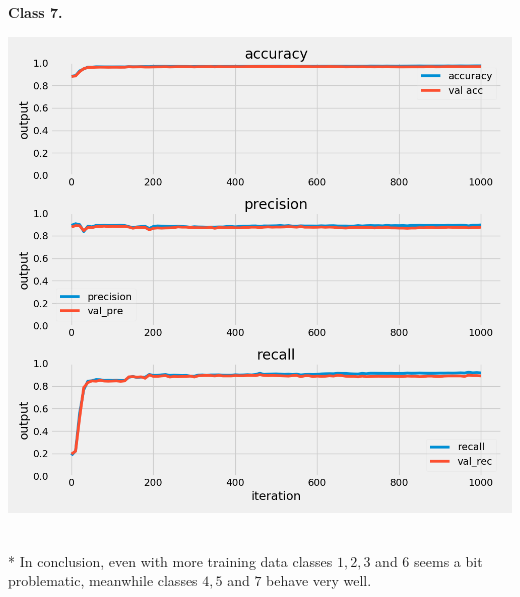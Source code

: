 \documentclass{article}
\begin{document}
\begin{multicols}{2}
	\begin{minipage}[t]{1\columnwidth}
	\begin{center}
	\textbf{Class 7.}\par\medskip
	\includegraphics[width=0.9\columnwidth]{../images/best_predictor_class_7_cross_val_1.png}
	\label{best}
	\end{center}
	\end{minipage}
	\text{ }
	\\*
	In conclusion, even with more training data classes $1,2,3$ and $6$ seems a bit problematic, 
	meanwhile classes $4,5$ and $7$ behave very well. 

\end{multicols}
\end{document}
